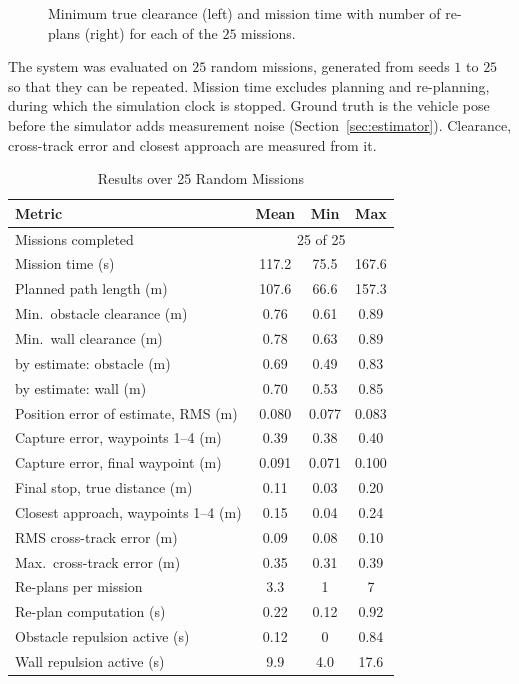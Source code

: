 \begin{figure}[!t]
    \centering
    \caption{Minimum true clearance (left) and mission time with number
    of re-plans (right) for each of the $25$ missions.}
    \label{fig:batch}
\end{figure}

The system was evaluated on $25$ random missions, generated from
seeds $1$ to $25$ so that they can be repeated. Mission time excludes
planning and re-planning, during which the simulation clock is stopped.
Ground truth is the vehicle pose before the simulator adds measurement
noise (Section~\ref{sec:estimator}). Clearance, cross-track error and
closest approach are measured from it.

\begin{table}[!t]
    \centering
    \caption{Results over 25 Random Missions}
    \label{tab:results}
    \footnotesize
    \begin{tabularx}{\columnwidth}{@{}X c c c@{}}
        \toprule
        \textbf{Metric} & \textbf{Mean} & \textbf{Min} & \textbf{Max} \\
        \midrule
        Missions completed                    & \multicolumn{3}{c}{25 of 25} \\
        Mission time (s)                      & 117.2 & 75.5 & 167.6 \\
        Planned path length (m)               & 107.6 & 66.6 & 157.3 \\
        Min.\ obstacle clearance (m)          & 0.76 & 0.61 & 0.89 \\
        Min.\ wall clearance (m)              & 0.78 & 0.63 & 0.89 \\
        \quad by estimate: obstacle (m)       & 0.69 & 0.49 & 0.83 \\
        \quad by estimate: wall (m)           & 0.70 & 0.53 & 0.85 \\
        Position error of estimate, RMS (m)   & 0.080 & 0.077 & 0.083 \\
        Capture error, waypoints 1--4 (m)     & 0.39 & 0.38 & 0.40 \\
        Capture error, final waypoint (m)     & 0.091 & 0.071 & 0.100 \\
        Final stop, true distance (m)         & 0.11 & 0.03 & 0.20 \\
        Closest approach, waypoints 1--4 (m)  & 0.15 & 0.04 & 0.24 \\
        RMS cross-track error (m)             & 0.09 & 0.08 & 0.10 \\
        Max.\ cross-track error (m)           & 0.35 & 0.31 & 0.39 \\
        Re-plans per mission                  & 3.3 & 1 & 7 \\
        Re-plan computation (s)               & 0.22 & 0.12 & 0.92 \\
        Obstacle repulsion active (s)         & 0.12 & 0 & 0.84 \\
        Wall repulsion active (s)             & 9.9 & 4.0 & 17.6 \\
        \bottomrule
    \end{tabularx}
\end{table}

